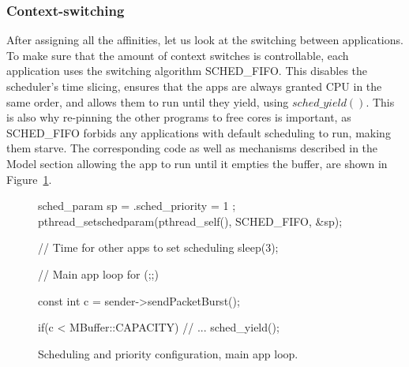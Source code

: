 \documentclass[english]{kththesis}
\begin{document}
\subsubsection{Context-switching}
After assigning all the affinities, let us look at the switching between applications. To make sure that the amount of context switches is controllable, each application uses the switching algorithm SCHED\_FIFO. This disables the scheduler's time slicing, ensures that the apps are always granted CPU in the same order, and allows them to run until they yield, using \(sched\_yield()\). This is also why re-pinning the other programs to free cores is important, as SCHED\_FIFO forbids any applications with default scheduling to run, making them starve. The corresponding code as well as mechanisms described in the Model section allowing the app to run until it empties the buffer, are shown in Figure~\ref{fig:switching}.

\begin{figure}[!ht]
\begin{code}
sched_param sp = { .sched_priority = 1 };
pthread_setschedparam(pthread_self(), 
                      SCHED_FIFO, 
                      &sp);

// Time for other apps to set scheduling
sleep(3);

// Main app loop
for (;;)
{
    const int c = sender->sendPacketBurst();

    if(c < MBuffer::CAPACITY)
    {
        // ...
        sched_yield();
    }
}
\end{code}
\caption{Scheduling and priority configuration, main app loop.}
\label{fig:switching}
\end{figure}
\end{document}
